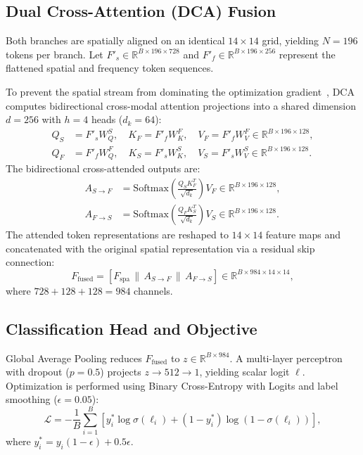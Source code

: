 \documentclass[11pt,a4paper]{article}
\begin{document}
\subsection{Dual Cross-Attention (DCA) Fusion}
Both branches are spatially aligned on an identical $14 \times 14$ grid, yielding $N = 196$ tokens per branch. Let $F'_s \in \mathbb{R}^{B \times 196 \times 728}$ and $F'_f \in \mathbb{R}^{B \times 196 \times 256}$ represent the flattened spatial and frequency token sequences. 

To prevent the spatial stream from dominating the optimization gradient~\cite{kashiani2025freqdebias}, DCA computes bidirectional cross-modal attention projections into a shared dimension $d=256$ with $h=4$ heads ($d_k = 64$):
\begin{align}
Q_S &= F'_s W_Q^S, \quad K_F = F'_f W_K^F, \quad V_F = F'_f W_V^F \in \mathbb{R}^{B \times 196 \times 128}, \\
Q_F &= F'_f W_Q^F, \quad K_S = F'_s W_K^S, \quad V_S = F'_s W_V^S \in \mathbb{R}^{B \times 196 \times 128}.
\end{align}
The bidirectional cross-attended outputs are:
\begin{align}
A_{S \to F} &= \text{Softmax}\left(\frac{Q_S K_F^T}{\sqrt{d_k}}\right) V_F \in \mathbb{R}^{B \times 196 \times 128}, \\
A_{F \to S} &= \text{Softmax}\left(\frac{Q_F K_S^T}{\sqrt{d_k}}\right) V_S \in \mathbb{R}^{B \times 196 \times 128}.
\end{align}
The attended token representations are reshaped to $14 \times 14$ feature maps and concatenated with the original spatial representation via a residual skip connection:
\begin{equation}
F_{\text{fused}} = \left[ F_{\text{spa}} \,\|\, A_{S \to F} \,\|\, A_{F \to S} \right] \in \mathbb{R}^{B \times 984 \times 14 \times 14},
\end{equation}
where $728 + 128 + 128 = 984$ channels.

\subsection{Classification Head and Objective}
Global Average Pooling reduces $F_{\text{fused}}$ to $z \in \mathbb{R}^{B \times 984}$. A multi-layer perceptron with dropout ($p=0.5$) projects $z \to 512 \to 1$, yielding scalar logit $\ell$. Optimization is performed using Binary Cross-Entropy with Logits and label smoothing ($\epsilon = 0.05$):
\begin{equation}
\mathcal{L} = -\frac{1}{B} \sum_{i=1}^B \left[ y^*_i \log \sigma(\ell_i) + (1 - y^*_i) \log(1 - \sigma(\ell_i)) \right],
\end{equation}
where $y^*_i = y_i(1 - \epsilon) + 0.5\epsilon$.
\end{document}
